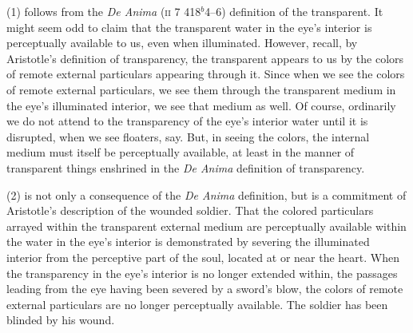 (1) follows from the \emph{De Anima} (\textsc{ii} 7 418\( ^{b} \)4--6) definition of the transparent. It might seem odd to claim that the transparent water in the eye's interior is perceptually available to us, even when illuminated. However, recall, by Aristotle's definition of transparency, the transparent appears to us by the colors of remote external particulars appearing through it. Since when we see the colors of remote external particulars, we see them through the transparent medium in the eye's illuminated interior, we see that medium as well. Of course, ordinarily we do not attend to the transparency of the eye's interior water until it is disrupted, when we see floaters, say. But, in seeing the colors, the internal medium must itself be perceptually available, at least in the manner of transparent things enshrined in the \emph{De Anima} definition of transparency. 

(2) is not only a consequence of the \emph{De Anima} definition, but is a commitment of Aristotle's description of the wounded soldier. That the colored particulars arrayed within the transparent external medium are perceptually available within the water in the eye's interior is demonstrated by severing the illuminated interior from the perceptive part of the soul, located at or near the heart. When the transparency in the eye's interior is no longer extended within, the passages leading from the eye having been severed by a sword's blow, the colors of remote external particulars are no longer perceptually available. The soldier has been blinded by his wound. 

